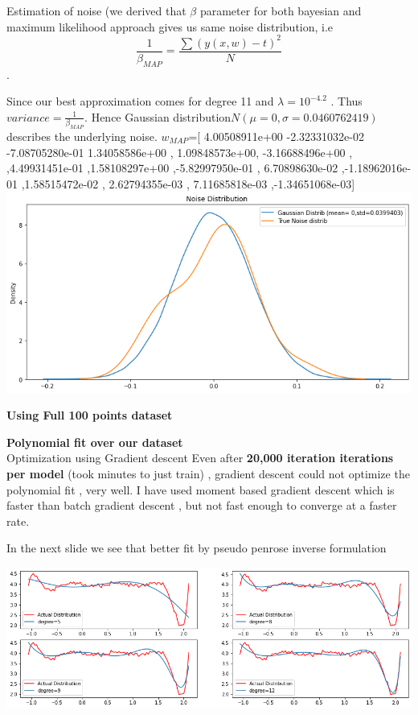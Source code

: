 \documentclass[11pt]{beamer}
\begin{document}
\begin{frame}
Estimation of noise (we derived that $\beta$ parameter for both bayesian and maximum likelihood approach gives us same noise distribution, i.e
$$\frac{1}{\beta_{MAP}}= \frac{\sum{(y(x,w)-t)^2}}{N}$$.

Since our best approximation comes for degree 11 and $\lambda=10^{-4.2}$ . Thus $variance =\frac{1}{\beta_{MAP}}$. Hence Gaussian distribution$N(\mu= 0,\sigma=0.0460762419) $describes the underlying noise.
$w_{MAP}$=[ 4.00508911e+00 -2.32331032e-02 -7.08705280e-01  1.34058586e+00
 , 1.09848573e+00, -3.16688496e+00 , ,4.49931451e-01  ,1.58108297e+00
 ,-5.82997950e-01 , 6.70898630e-02 ,-1.18962016e-01  ,1.58515472e-02
 , 2.62794355e-03 , 7.11685818e-03 ,-1.34651068e-03]\\

\includegraphics[scale=0.2]{images/31.png}
\end{frame}


\begin{frame}
\textbf{Using Full 100 points dataset}
\end{frame}

\begin{frame}
\textbf{Polynomial fit over our dataset}\\ 
Optimization using Gradient descent
Even after  \textbf{20,000 iteration iterations per model} (took minutes to just train)  , gradient descent could not optimize the polynomial fit , very well. 
I have used moment based gradient descent which is faster than batch gradient descent , but  not fast enough to converge at a faster rate.

In the next slide we see that better fit by pseudo penrose inverse formulation

\includegraphics[scale=0.28]{images/34.png}


\end{frame}
\end{document}
